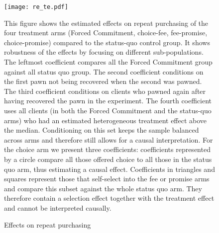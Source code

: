 \documentclass[oneside,11pt]{article}
\begin{document}
    

        

\vspace{3ex}

\vspace{.3in}
\begin{figure}[H]
        \caption{Effects on repeat purchasing}
    \label{reincidence}
    \begin{center}
        \centering
        \texttt{[image: re\_te.pdf]}
    \end{center}
     \scriptsize This figure shows the estimated effects on repeat purchasing of the four treatment arms (Forced Commitment, choice-fee, fee-promise, choice-promise) compared to the status-quo control group. It shows robustness of the effects by focusing on different sub-populations. The leftmost coefficient compares all the Forced Commitment group against all status quo group. The second coefficient conditions on the first pawn not being recovered when the second was pawned. The third coefficient conditions on clients who pawned again after having recovered the pawn in the experiment. The fourth coefficient uses all clients (in both the Forced Commitment and the status-quo arms) who had an estimated heterogeneous treatment effect above the median. Conditioning on this set keeps the sample balanced across arms and therefore still allows for a causal interpretation. For the choice arm we present three coefficients: coefficients represented by a circle compare all those offered choice to all those in the status quo arm, thus estimating a causal effect. Coefficients in triangles and squares represent those that self-select into the fee or promise arms and compare this subset against the whole status quo arm. They therefore contain a selection effect together with the treatment effect and cannot be interpreted causally.
\end{figure}
\end{document}
